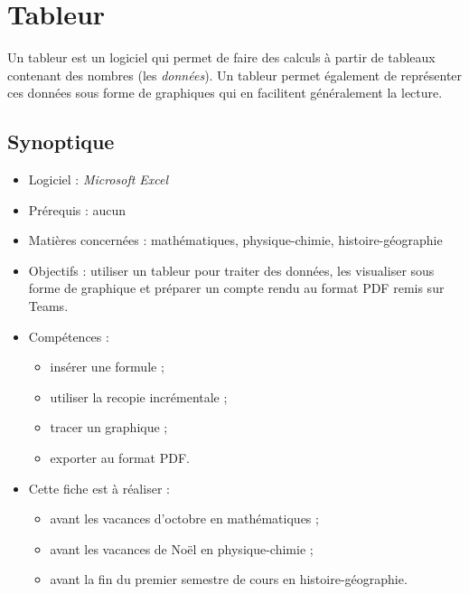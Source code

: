 \chapter{Tableur}\label{ficheTableur1}  

Un tableur est un logiciel qui permet de faire des calculs à partir de tableaux contenant des nombres (les \emph{données}). Un tableur permet également de représenter ces données sous forme de graphiques qui en facilitent généralement la lecture.\\


\section*{Synoptique}

{\footnotesize
\begin{itemize}
\item Logiciel : \emph{Microsoft Excel}
\item Prérequis : aucun
\item Matières concernées : mathématiques, physique-chimie, histoire-géographie
\item Objectifs : utiliser un tableur pour traiter des données, les visualiser sous forme de graphique et préparer un compte rendu au format PDF remis sur Teams.
\item Compétences : 
        \begin{itemize}
        \item insérer une formule ;
        \item utiliser la recopie incrémentale ;
        \item tracer un graphique ;
        \item exporter au format PDF.
        \end{itemize}
\item Cette fiche est à réaliser :
        \begin{itemize}
        \item avant les vacances d'octobre en mathématiques ;
        \item avant les vacances de Noël en physique-chimie ;
        \item avant la fin du premier semestre de cours en histoire-géographie. 
        \end{itemize}
\end{itemize}
}


